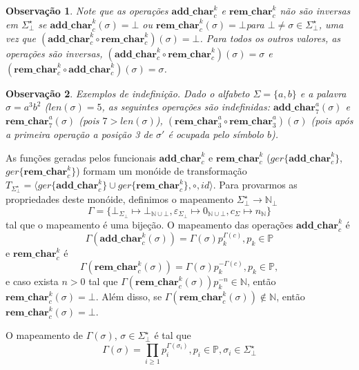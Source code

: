 \documentclass[a4paper]{article}
\newcommand{\baseset}{{\Sigma^\star_\bot}}
\newcommand{\addc}[2]{{\mathbf{add\_char}_{#1}^{#2}}}
\newcommand{\opa}{{\addc{c}{k}}}
\newcommand{\remc}[2]{{\mathbf{rem\_char}_{#1}^{#2}}}
\newcommand{\gopa}{{ger\{\opa\}}}
\newcommand{\opb}{{\remc{c}{k}}}
\newcommand{\gopb}{{ger\{\opb\}}}
\newcommand{\transMon}{{T_\baseset}}
\newcommand{\composition}{{\circ}}
\newcommand{\len}[1]{{len(#1)}}
\begin{document}
\newtheorem{obs}{Observação}[section]
\begin{obs}
Note que as operações $\opa$ e $\opb$ não são inversas em $\baseset$ se $\opa(\sigma) = \bot$ ou $\opb(\sigma) = \bot$para $\bot \neq \sigma \in \baseset$, uma vez que $(\opa \composition \opb)(\sigma) = \bot$. Para todos os outros valores, as operações são inversas, $(\opa \composition \opb)(\sigma) = \sigma$ e $(\opb \composition \opa)(\sigma) = \sigma$.
\end{obs}

\begin{obs}
Exemplos de indefinição. Dado o alfabeto $\Sigma = \{a, b\}$ e a palavra $\sigma = a^3b^2$ ($\len{\sigma} = 5$, as seguintes operações são indefinidas: $\addc{7}{a}(\sigma)$ e $\remc{7}{a}(\sigma)$ (pois $7 > \len{\sigma}$), $(\remc{3}{a} \composition \remc{3}{a})(\sigma)$ (pois após a primeira operação a posição 3 de $\sigma\prime$ é ocupada pelo símbolo $b$).
\end{obs}  

As funções geradas pelos funcionais $\opa$ e $\opb$ ($\gopa$, $\gopb$) formam um monóide de transformação $\transMon = \langle\gopa \cup \gopb, \composition, id\rangle$. Para provarmos as propriedades deste monóide, definimos o mapeamento $\baseset \to \mathbb{N}_\bot$
\begin{equation} \label{map:set}
\Gamma = \{ \bot_{\Sigma_\bot} \mapsto \bot_{\mathbb{N}\cup \bot}, \varepsilon_{\Sigma_\bot} \mapsto 0_{\mathbb{N}\cup \bot}, c_{\Sigma} \mapsto n_{\mathbb{N}}\}
\end{equation}
tal que o mapeamento é uma bijeção. O mapeamento das operações $\opa$ é
\begin{equation} \label{map:opa}
\Gamma(\opa(\sigma)) = \Gamma(\sigma) p_k^{\Gamma(c)}, p_k \in \mathbb{P}
\end{equation}
e $\opb$ é
\begin{equation} \label{map:opb}
\Gamma(\opb(\sigma)) = \Gamma(\sigma) p_k^{-\Gamma(c)}, p_k \in \mathbb{P},
\end{equation}
e caso exista $n > 0$ tal que $\Gamma(\opb(\sigma)) p_k^{-n} \in \mathbb{N}$, então $\opb(\sigma) = \bot$. Além disso, se $\Gamma(\opb(\sigma)) \notin \mathbb{N}$, então $\opb(\sigma) = \bot$. 

O mapeamento de $\Gamma(\sigma)$, $\sigma \in \baseset$ é tal que
\begin{equation} \label{map:sigma}
\Gamma(\sigma) = \prod_{i \ge 1} p_i^{\Gamma(\sigma_i)}, p_i \in \mathbb{P}, \sigma_i \in \baseset
\end{equation}
\end{document}
